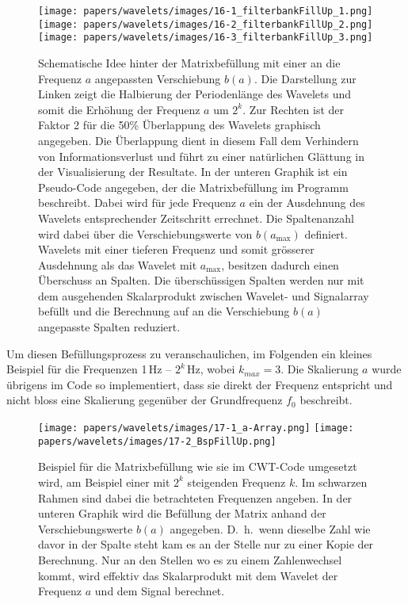 \begin{figure}
	\centering
	\texttt{[image: papers/wavelets/images/16-1\_filterbankFillUp\_1.png]}
	\texttt{[image: papers/wavelets/images/16-2\_filterbankFillUp\_2.png]}
	\texttt{[image: papers/wavelets/images/16-3\_filterbankFillUp\_3.png]}
	\caption{Schematische Idee hinter der Matrixbefüllung mit
	einer an die Frequenz $a$ angepassten Verschiebung $b(a)$.
	Die Darstellung zur Linken zeigt die Halbierung der
	Periodenlänge des Wavelets und somit die Erhöhung der
	Frequenz $a$ um $2^k$.
	Zur Rechten ist der Faktor 2 für die 50\% Überlappung des
	Wavelets graphisch angegeben.
	Die Überlappung dient in diesem Fall dem Verhindern von
	Informationsverlust und führt zu einer natürlichen Glättung
	in der Visualisierung der Resultate.
	In der unteren Graphik ist ein Pseudo-Code angegeben, der
	die Matrixbefüllung im Programm beschreibt.
	Dabei wird für jede Frequenz $a$ ein der Ausdehnung des
	Wavelets entsprechender Zeitschritt errechnet.
	Die Spaltenanzahl wird dabei über die Verschiebungswerte
	von $b(a_\text{max})$ definiert.
	Wavelets mit einer tieferen Frequenz und somit grösserer
	Ausdehnung als das Wavelet mit $a_\text{max}$, besitzen
	dadurch einen Überschuss an Spalten. Die überschüssigen
	Spalten werden nur mit dem ausgehenden Skalarprodukt zwischen
	Wavelet- und Signalarray befüllt und die Berechnung auf an
	die Verschiebung $b(a)$ angepasste Spalten reduziert.}
	\label{wavelet:fig:filterbankFillUp}
\end{figure}

Um diesen Befüllungsprozess zu veranschaulichen, im Folgenden ein
kleines Beispiel für die Frequenzen 1\,Hz – $2^k$\,Hz, wobei $k_{max}
= 3$.
Die Skalierung $a$ wurde übrigens im Code so implementiert, dass
sie direkt der Frequenz entspricht und nicht bloss eine Skalierung
gegenüber der Grundfrequenz $f_0$ beschreibt.

\begin{figure}
	\centering
	\texttt{[image: papers/wavelets/images/17-1\_a-Array.png]}
	\texttt{[image: papers/wavelets/images/17-2\_BspFillUp.png]}
	\caption{Beispiel für die Matrixbefüllung wie sie im CWT-Code
	umgesetzt wird, am Beispiel einer mit $2^k$ steigenden
	Frequenz $k$.
	Im schwarzen Rahmen sind dabei die betrachteten Frequenzen angeben.
	In der unteren Graphik wird die Befüllung der Matrix anhand
	der Verschiebungswerte $b(a)$ angegeben.
	D.~h.~wenn dieselbe Zahl wie davor in der Spalte steht kam
	es an der Stelle nur zu einer Kopie der Berechnung.
	Nur an den Stellen wo es zu einem Zahlenwechsel kommt, wird
	effektiv das Skalarprodukt mit dem Wavelet der Frequenz $a$
	und dem Signal berechnet.}
	\label{wavelet:fig:BspFillUp}
\end{figure}

